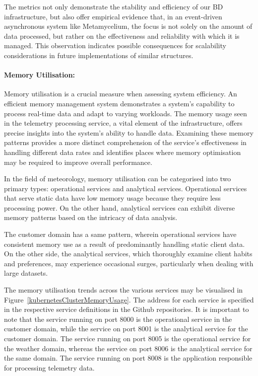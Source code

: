 \documentclass[journal]{IEEEtran}
\begin{document}
The metrics not only demonstrate the stability and efficiency of our BD infrastructure, but also offer empirical evidence that, in an event-driven asynchronous system like Metamycelium, the focus is not solely on the amount of data processed, but rather on the effectiveness and reliability with which it is managed. This observation indicates possible consequences for scalability considerations in future implementations of similar structures.


\paragraph{Memory Utilisation:}

Memory utilisation is a crucial measure when assessing system efficiency. An efficient memory management system demonstrates a system's capability to process real-time data and adapt to varying workloads. The memory usage seen in the telemetry processing service, a vital element of the infrastructure, offers precise insights into the system's ability to handle data. Examining these memory patterns provides a more distinct comprehension of the service's effectiveness in handling different data rates and identifies places where memory optimisation may be required to improve overall performance.

In the field of meteorology, memory utilisation can be categorised into two primary types: operational services and analytical services. Operational services that serve static data have low memory usage because they require less processing power. On the other hand, analytical services can exhibit diverse memory patterns based on the intricacy of data analysis.

The customer domain has a same pattern, wherein operational services have consistent memory use as a result of predominantly handling static client data. On the other side, the analytical services, which thoroughly examine client habits and preferences, may experience occasional surges, particularly when dealing with large datasets.

The memory utilisation trends across the various services may be visualised in Figure~\ref{kubernetesClusterMemoryUsage}. The address for each service is specified in the respective service definitions in the Github repositories. It is important to note that the service running on port 8000 is the operational service in the customer domain, while the service on port 8001 is the analytical service for the customer domain. The service running on port 8005 is the operational service for the weather domain, whereas the service on port 8006 is the analytical service for the same domain. The service running on port 8008 is the application responsible for processing telemetry data.
\end{document}
